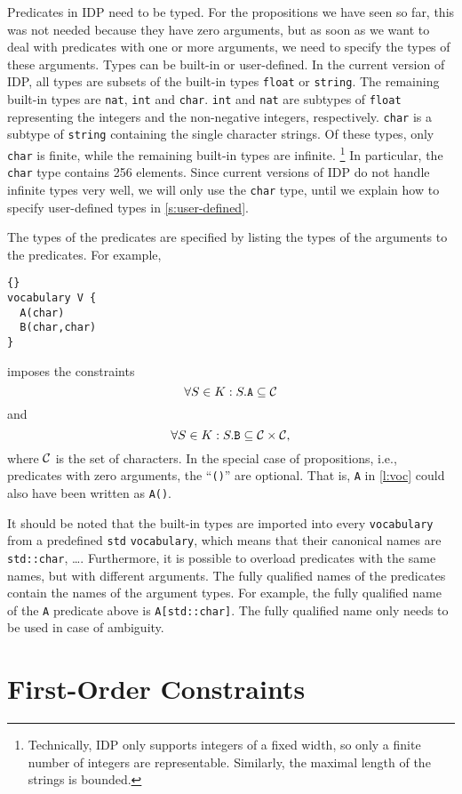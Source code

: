 \documentclass{article}
\newcommand{\idp}{{\sc IDP}\xspace}
\begin{document}
Predicates in \idp need to be typed.  For the propositions we have
seen so far, this was not needed because they have zero arguments,
but as soon as we want to deal with predicates with one or more arguments,
we need to specify the types of these arguments.
Types can be built-in or user-defined.
In the current version of \idp, all types are subsets of
the built-in types \texttt{float} or \texttt{string}.
The remaining built-in types are \texttt{nat}, \texttt{int} and
\texttt{char}.  \texttt{int} and \texttt{nat} are subtypes of
\texttt{float} representing the integers and the non-negative
integers, respectively.  \texttt{char} is a subtype of \texttt{string}
containing the single character strings.
Of these types, only \texttt{char} is finite, while the remaining
built-in types are infinite.%
\footnote{Technically, \idp only supports integers of a fixed width,
so only a finite number of integers are representable.  Similarly,
the maximal length of the strings is bounded.}
In particular, the \texttt{char} type contains 256 elements.
Since current versions of \idp do not handle infinite types very well,
we will only use the \texttt{char} type, until we explain how
to specify user-defined types in \autoref{s:user-defined}.

The types of the predicates are specified by listing the types
of the arguments to the predicates.  For example,
\begin{lstlisting}{}
vocabulary V {
  A(char)
  B(char,char)
}
\end{lstlisting}
imposes the constraints
$$
\forall S \in K : S.\mathtt{A} \subseteq {\cal C}
$$
and
$$
\forall S \in K : S.\mathtt{B} \subseteq {\cal C} \times {\cal C}
,
$$
where $\cal C$ is the set of characters.
In the special case of propositions, i.e., predicates with zero arguments,
the ``\texttt{()}'' are optional.  That is, \texttt{A} in \autoref{l:voc}
could also have been written as \texttt{A()}.

It should be noted that the built-in types are imported into
every \texttt{vocabulary} from a predefined \texttt{std} \texttt{vocabulary},
which means that their canonical names are \texttt{std::char}, \ldots.
Furthermore, it is possible to overload predicates with the same names,
but with different arguments.  The fully qualified names of the predicates
contain the names of the argument types.  For example, the
fully qualified name of the \texttt{A} predicate above is
\texttt{A[std::char]}.
The fully qualified name only needs to be used in case of ambiguity.

\section{First-Order Constraints}
\label{s:first-order}
\end{document}
